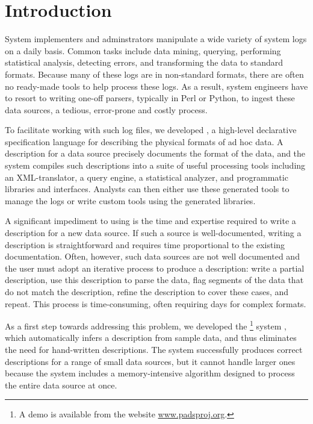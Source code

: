 \section{Introduction}
\label{sec:intro}

System implementers and adminstrators manipulate a wide
variety of system logs on a daily basis.
Common tasks include data mining, querying, performing statistical analysis,
detecting errors, and transforming the data to standard formats.
Because many of these logs are in non-standard formats,
there are often no ready-made tools to help process these logs.
As a result, system engineers have to resort to writing one-off
parsers, typically in Perl or Python, to ingest these data sources,
a tedious, error-prone and costly process. 

To facilitate working with such log files, we developed \pads
\cite{fisher+:pads}, a high-level declarative
specification language for describing the physical formats of ad hoc
data. A \pads{} description for a data source precisely documents the
format of the data, and the \pads{} system compiles such descriptions
into a suite of useful processing tools including an XML-translator, a
query engine, a statistical analyzer, and programmatic libraries and
interfaces. Analysts can then either use these generated tools to
manage the logs or write custom tools using the generated libraries.

A significant impediment to using \pads{} is the time and 
expertise required to write a \pads{} description for a new data
source.  If such a source is well-documented, writing a \pads{}
description is straightforward and requires time proportional to the
existing documentation.  Often, however, such data sources are not
well documented and the user must adopt an iterative process to produce
a description: write a partial description, use this description to
parse the data, flag segments of the data that do not match the
description, refine the description to cover these cases, and repeat.
This process is time-consuming, often requiring days for complex
formats. 

As a first step towards addressing this problem, we developed the
\learnpads{}\footnote{
  A demo is available from the \pads{} website \url{www.padsproj.org}.
}
system \cite{Fisher+:dirttoshovels,xi08:tokenization-short},
which automatically infers a \pads{} description from sample data, and
thus eliminates the need for hand-written descriptions. The
\learnpads{} system successfully produces correct descriptions for a
range of small data sources, but it cannot handle larger ones because
the system includes a memory-intensive algorithm designed to process
the entire data source at once.

